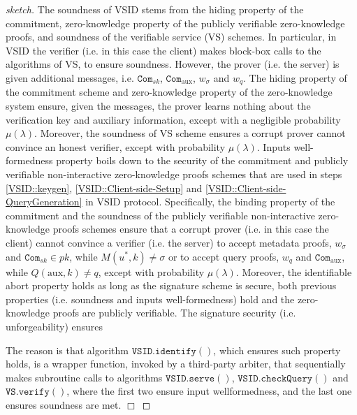 
\begin{proof}[sketch] The soundness  of VSID  stems  from the hiding property of the commitment, zero-knowledge property of the publicly verifiable zero-knowledge proofs, and soundness of  the  verifiable service (VS) schemes. In particular, in VSID the verifier (i.e. in this case the client) makes block-box calls to the algorithms of   VS, to ensure soundness. However, the prover (i.e.  the server) is given  additional messages, i.e.   $\mathtt{Com}_{\scriptscriptstyle sk}$,  $\mathtt{Com}_{\scriptscriptstyle \text{aux}}$, $w_{\scriptscriptstyle\sigma}$ and $w_{\scriptscriptstyle q}$. The hiding property of the commitment scheme and zero-knowledge property of the zero-knowledge system ensure, given the messages, the prover learns nothing about the verification key and auxiliary information, except with a negligible probability $\mu(\lambda)$. Moreover, the soundness of VS scheme ensures a corrupt prover cannot convince an honest verifier, except with  probability $\mu(\lambda)$.   Inputs well-formedness property boils down to the security of the commitment and publicly verifiable non-interactive zero-knowledge proofs   schemes that are used in steps \ref{VSID::keygen}, \ref{VSID::Client-side-Setup} and \ref{VSID::Client-side-QueryGeneration} in VSID protocol. Specifically,  the binding property of the commitment and the soundness of the publicly verifiable non-interactive zero-knowledge proofs schemes  ensure that a corrupt prover (i.e. in this case the client) cannot convince a verifier (i.e. the server) to accept metadata proofs, $w_{\scriptscriptstyle\sigma}$ and $\mathtt{Com}_{\scriptscriptstyle sk}\in pk$, while  $M(u^{\scriptscriptstyle *},k)\neq \sigma $ or to accept query proofs, $w_{\scriptscriptstyle q}$ and $\mathtt{Com}_{\scriptscriptstyle \text{aux}}$, while $Q(\text{aux},k)\neq q$, except with  probability $\mu(\lambda)$. Moreover, the identifiable abort property holds as long as the signature scheme is secure, both previous properties (i.e. soundness and inputs well-formedness) hold and the zero-knowledge proofs are publicly verifiable. The signature security (i.e. unforgeability) ensures  


The reason is that algorithm $\mathtt{VSID.identify}()$, which  ensures such property  holds,  is a wrapper function, invoked by a third-party arbiter, that sequentially makes subroutine calls to algorithms  $\mathtt{VSID.serve}()$,  $\mathtt{VSID.checkQuery}()$ and $\mathtt{VS.verify}()$,   where the first two ensure input wellformedness, and the last one ensures soundness are met. 
  \hfill\(\Box\)\end{proof}